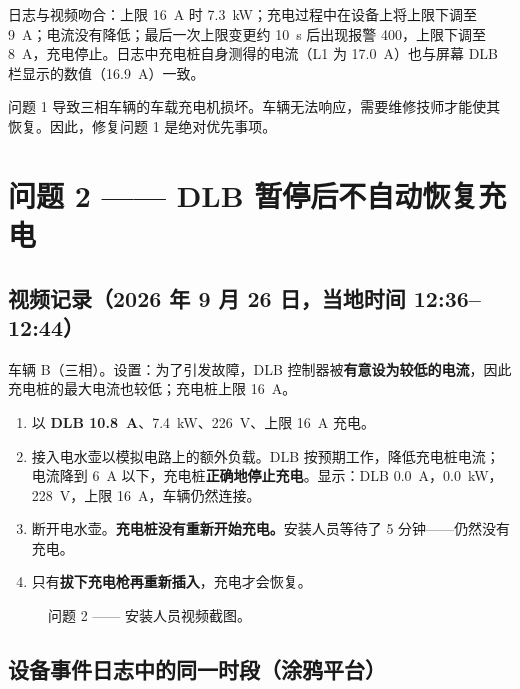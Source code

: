 \documentclass[11pt,a4paper]{article}
\begin{document}
日志与视频吻合：上限 16~A 时 7.3~kW；充电过程中在设备上将上限下调至 9~A；电流没有降低；最后一次上限变更约 10~s 后出现报警 400，上限下调至 8~A，充电停止。日志中充电桩自身测得的电流（L1 为 17.0~A）也与屏幕 DLB 栏显示的数值（16.9~A）一致。

\begin{apredb}[后果]
问题 1 导致三相车辆的车载充电机损坏。车辆无法响应，需要维修技师才能使其恢复。因此，修复问题 1 是绝对优先事项。
\end{apredb}

\section{问题 2 —— DLB 暂停后不自动恢复充电}

\subsection{视频记录（2026 年 9 月 26 日，当地时间 12:36–12:44）}

车辆 B（三相）。设置：为了引发故障，DLB 控制器被\textbf{有意设为较低的电流}，因此充电桩的最大电流也较低；充电桩上限 16~A。

\begin{enumerate}[leftmargin=2.2em]
\item {} 以 \textbf{DLB 10.8~A}、7.4~kW、226~V、上限 16~A 充电。
\item {} 接入电水壶以模拟电路上的额外负载。DLB 按预期工作，降低充电桩电流；电流降到 6~A 以下，充电桩\textbf{正确地停止充电}。显示：DLB 0.0~A，0.0~kW，228~V，上限 16~A，车辆仍然连接。
\item {} 断开电水壶。\textbf{充电桩没有重新开始充电。}安装人员等待了 5 分钟——仍然没有充电。
\item {} 只有\textbf{拔下充电枪再重新插入}，充电才会恢复。
\end{enumerate}

\begin{figure}[H]
\centering
{}\hspace{1.5cm}
\caption{问题 2 —— 安装人员视频截图。}
\label{fig:p2}
\end{figure}

\subsection{设备事件日志中的同一时段（涂鸦平台）}
\end{document}
